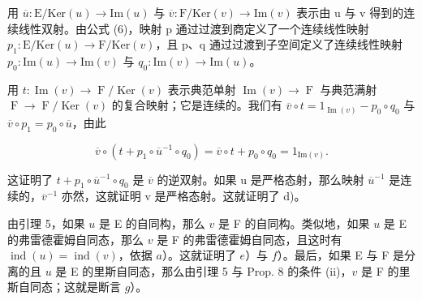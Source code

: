用 \(\overline{u}\colon\mathrm{E}/\mathrm{Ker}(u)\to\mathrm{Im}(u)\) 与 \(\overline{v}\colon\mathrm{F}/\mathrm{Ker}(v)\to\mathrm{Im}(v)\) 表示由 u 与 v 得到的连续线性双射。由公式 (6)，映射 p 通过过渡到商定义了一个连续线性映射 \(p_{1}\colon\mathrm{E}/\mathrm{Ker}(u)\to\mathrm{F}/\mathrm{Ker}(v)\)，且 p、q 通过过渡到子空间定义了连续线性映射 \(p_{0}\colon\mathrm{Im}(u)\to\mathrm{Im}(v)\) 与 \(q_{0}\colon\mathrm{Im}(v)\to\mathrm{Im}(u)\)。

用 \(t \colon \operatorname{Im}(v) \to \operatorname{F} / \operatorname{Ker}(v)\) 表示典范单射 \(\operatorname{Im}(v) \to \operatorname{F}\) 与典范满射 \(\operatorname{F} \to \operatorname{F} / \operatorname{Ker}(v)\) 的复合映射；它是连续的。我们有 \(\overline{v} \circ t = 1_{\operatorname{Im}(v)} - p_0 \circ q_0\) 与 \(\overline{v} \circ p_1 = p_0 \circ \overline{u}\)，由此

\[
\overline {{v}} \circ (t + p _ {1} \circ \overline {{u}} ^ {- 1} \circ q _ {0}) = \overline {{v}} \circ t + p _ {0} \circ q _ {0} = 1 _ {\mathrm{Im} (v)}.
\]

这证明了 \(t + p_{1} \circ \overline{u}^{-1} \circ q_{0}\) 是 \(\overline{v}\) 的逆双射。如果 u 是严格态射，那么映射 \(\overline{u}^{-1}\) 是连续的，\(\overline{v}^{-1}\) 亦然，这就证明 v 是严格态射。这就证明了 d)。

由引理 5，如果 \(u\) 是 E 的自同构，那么 \(v\) 是 F 的自同构。类似地，如果 \(u\) 是 E 的弗雷德霍姆自同态，那么 \(v\) 是 F 的弗雷德霍姆自同态，且这时有 \(\operatorname{ind}(u) = \operatorname{ind}(v)\)，依据 \(a\)）。这就证明了 \(e\)）与 \(f\)）。最后，如果 E 与 F 是分离的且 \(u\) 是 E 的里斯自同态，那么由引理 5 与 Prop. 8 的条件 (ii)，\(v\) 是 F 的里斯自同态；这就是断言 \(g\)）。

